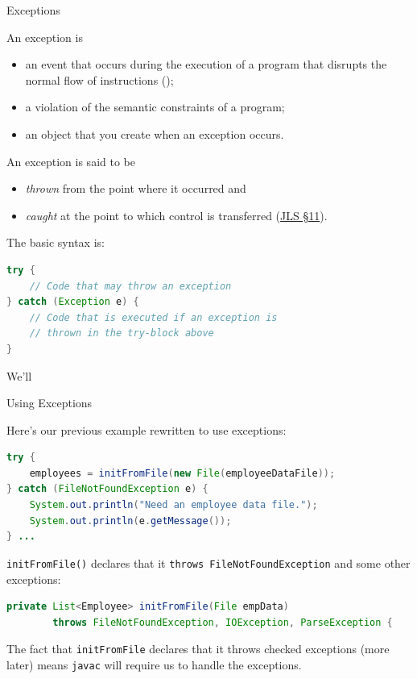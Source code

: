 \documentclass{beamer}
\begin{document}
\begin{frame}[fragile]{Exceptions}


An exception is
\begin{itemize}
\item an event that occurs during the execution of a program that disrupts the normal flow of instructions ();
\item a violation of the semantic constraints of a program;
\item an object that you create when an exception occurs.
\end{itemize}
\vspace{.1in}
An exception is said to be 
\begin{itemize}
\item {\it thrown} from the point where it occurred and
\item {\it caught} at the point to which control is transferred (\href{http://docs.oracle.com/javase/specs/jls/se7/html/jls-11.html}{JLS \S 11}).
\end{itemize} 
The basic syntax is:
\begin{lstlisting}[language=Java]
try {
    // Code that may throw an exception
} catch (Exception e) {
    // Code that is executed if an exception is
    // thrown in the try-block above
}
\end{lstlisting}
We'll

\end{frame}

\begin{frame}[fragile]{Using Exceptions}


Here's our previous example rewritten to use exceptions:
\begin{lstlisting}[language=Java]
try {
    employees = initFromFile(new File(employeeDataFile));
} catch (FileNotFoundException e) {
    System.out.println("Need an employee data file.");
    System.out.println(e.getMessage());
} ...
\end{lstlisting}
{\tt initFromFile()} declares that it {\tt throws FileNotFoundException} and some other exceptions:
\begin{lstlisting}[language=Java]
private List<Employee> initFromFile(File empData)
        throws FileNotFoundException, IOException, ParseException {
\end{lstlisting}

The fact that {\tt initFromFile} declares that it throws checked exceptions (more later) means {\tt javac} will require us to handle the exceptions.

\end{frame}
\end{document}
